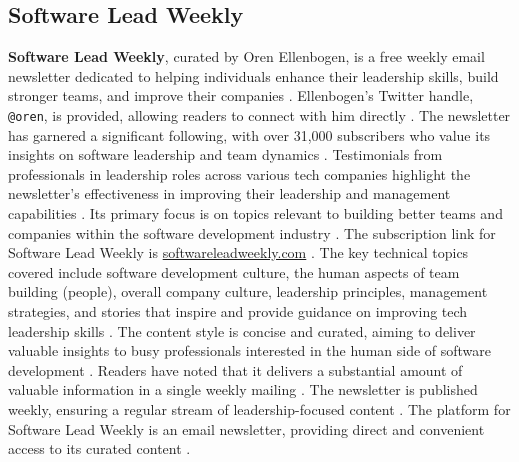 \documentclass[11pt]{article}
\begin{document}
\subsection{Software Lead Weekly}
\textbf{Software Lead Weekly}, curated by Oren Ellenbogen, is a free weekly email newsletter dedicated to helping individuals enhance their leadership skills, build stronger teams, and improve their companies \citep{ctoclub2025swe}. Ellenbogen's Twitter handle, \texttt{@oren}, is provided, allowing readers to connect with him directly \citep{ellenbogen2025slw}. The newsletter has garnered a significant following, with over 31,000 subscribers who value its insights on software leadership and team dynamics \citep{ctoclub2025swe}. Testimonials from professionals in leadership roles across various tech companies highlight the newsletter's effectiveness in improving their leadership and management capabilities \citep{ellenbogen2025slw}. Its primary focus is on topics relevant to building better teams and companies within the software development industry \citep{ellenbogen2025slw}. The subscription link for Software Lead Weekly is \url{softwareleadweekly.com} \citep{runcloud2025worlds}. The key technical topics covered include software development culture, the human aspects of team building (people), overall company culture, leadership principles, management strategies, and stories that inspire and provide guidance on improving tech leadership skills \citep{runcloud2025worlds}. The content style is concise and curated, aiming to deliver valuable insights to busy professionals interested in the human side of software development \citep{runcloud2025worlds}. Readers have noted that it delivers a substantial amount of valuable information in a single weekly mailing \citep{ellenbogen2025slw}. The newsletter is published weekly, ensuring a regular stream of leadership-focused content \citep{runcloud2025worlds}. The platform for Software Lead Weekly is an email newsletter, providing direct and convenient access to its curated content \citep{ellenbogen2025slw}.
\end{document}
